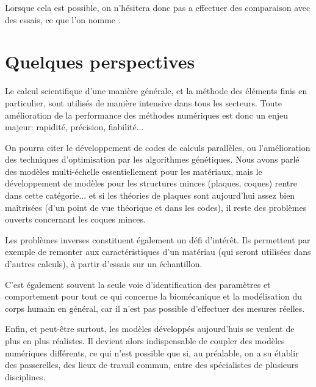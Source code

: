 Lorsque cela est possible, on n'hésitera donc pas a effectuer des comparaison avec des essais, ce que l'on nomme
.



\medskip
\section*{Quelques perspectives}

Le calcul scientifique d'une manière générale, et la méthode des éléments finis en particulier, sont utilisés de manière intensive dans
tous les secteurs.
\medskipvm
Toute amélioration de la performance des méthodes numériques est donc un enjeu majeur: rapidité,
précision, fiabilité...

On pourra citer le développement de codes de calculs parallèles, ou l'amélioration des techniques d'optimisation
par les algorithmes génétiques.
\medskipvm
Nous avons parlé des modèles multi-échelle essentiellement pour les matériaux, mais le développement de modèles
pour les structures minces (plaques, coques) rentre dans cette catégorie... et si les théories de plaques sont aujourd'hui
assez bien maîtrisées (d'un point de vue théorique et dans les codes), il reste des problèmes ouverts concernant
les coques minces.

\medskip
Les problèmes inverses constituent également un défi d'intérêt.
Ils permettent par exemple de remonter aux caractéristiques d'un matériau (qui seront utilisées dans d'autres
calculs), à partir d'essais sur un échantillon.

C'est également souvent la seule voie d'identification des paramètres et comportement pour tout ce qui
concerne la biomécanique et la modélisation du corps humain en général, car il n'est pas possible d'effectuer
des mesures réelles.

\medskip
Enfin, et peut-être surtout, les modèles développés aujourd'huis se veulent de plus en plus réalistes.
Il devient alors indispensable de coupler des modèles numériques différents, ce qui n'est possible
que si, au préalable, on a su établir des passerelles, des lieux de travail commun, entre des
spécialistes de plusieurs disciplines.
